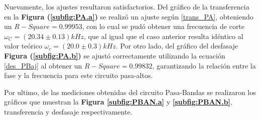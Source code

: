 \documentclass[11pt,a4paper]{article}
\begin{document}
Nuevamente, los ajustes resultaron satisfactorios. Del gráfico de la transferencia en la \textbf{Figura (\ref{subfig:PA.a})} se realizó un ajuste según \eqref{trans_PA}, obteniendo un $R-Square = 0.99953$, con lo cual se pudó obtener una frecuencia de corte $\omega_C = (20.34 \pm 0.13)kHz$, que al igual que el caso anterior resulta idéntico al valor teórico $\omega_c = (20.0 \pm 0.3)kHz$. Por otro lado, del gráfico del desfasaje \textbf{Figura (\ref{subfig:PA.b})} se ajustó correctamente utilizando la ecuación \eqref{des_PBaj} al obtener un $R-Square = 0.99832$, garantizando la relación entre la fase y la frecuencia para este circuito pasa-altos.

\bigskip

Por ultimo, de las mediciones obtenidas del circuito Pasa-Bandas se realizaron los gráficos que muestran la \textbf{Figura \ref{subfig:PBAN.a}} y \textbf{\ref{subfig:PBAN.b}}, transferencia y desfasaje respectivamente.
\end{document}
